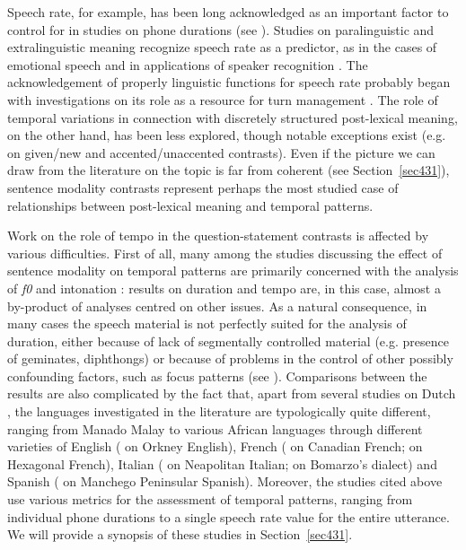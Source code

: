 Speech rate, for example, has been long acknowledged as an important factor to control for in studies on phone durations (see \citealt{turk2006acoustic}). Studies on paralinguistic and extralinguistic meaning recognize speech rate as a predictor, as in the cases of emotional speech \citep{williams1972emotions} and in applications of speaker recognition \citep{vanheerden2007speech}. The acknowledgement of properly linguistic functions for speech rate probably began with investigations on its role as a resource for turn management \citep{duncan1972signals}. The role of temporal variations in connection with discretely structured post-lexical meaning, on the other hand, has been less explored, though notable exceptions exist (e.g. \citealt{eefting1991effect} on given/new and accented/unaccented contrasts). Even if the picture we can draw from the literature on the topic is far from coherent (see Section~\ref{sec431}), sentence modality contrasts represent perhaps the most studied case of relationships between post-lexical meaning and temporal patterns.

Work on the role of tempo in the question-statement contrasts is affected by various difficulties. First of all, many among the studies discussing the effect of sentence modality on temporal patterns are primarily concerned with the analysis of \textit{f0} and intonation \citep{maturi1988intonazione,ryalls1994effects,smith2002prosodic,rialland2007question,petrone2008role}: results on duration and tempo are, in this case, almost a by-product of analyses centred on other issues. As a natural consequence, in many cases the speech material is not perfectly suited for the analysis of duration, either because of lack of segmentally controlled material  (e.g. presence of geminates, diphthongs) or because of problems in the control of other possibly confounding factors, such as focus patterns (see \citealt{gubian2011joint}). Comparisons between the results are also complicated by the fact that, apart from several studies on Dutch \citep{vanheuven2000phonetic,vanheuven2002temporal,vanheuven2005speech}, the languages investigated in the literature are typologically quite different, ranging from Manado Malay \citep{vanheuven2005speech} to various African languages \citep{rialland2007question} through different varieties of English (\citealt{vanheuven2005speech} on Orkney English), French (\citealt{ryalls1994effects} on Canadian French; \citealt{smith2002prosodic} on Hexagonal French), Italian (\citealt{maturi1988intonazione,petrone2008role} on Neapolitan Italian; \citealt{dedominicis2010interrogative} on Bomarzo’s dialect) and Spanish (\citealt{henriksen2012intonation} on Manchego Peninsular Spanish). Moreover, the studies cited above use various metrics for the assessment of temporal patterns, ranging from individual phone durations to a single speech rate value for the entire utterance. We will provide a synopsis of these studies in Section~\ref{sec431}.

